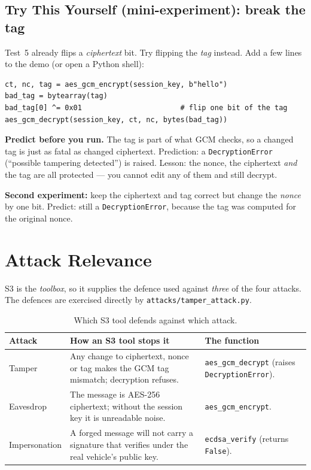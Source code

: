 \documentclass[11pt,a4paper]{report}
\begin{document}
\subsection{Try This Yourself (mini-experiment): break the tag}
Test~5 already flips a \emph{ciphertext} bit. Try flipping the \emph{tag}
instead. Add a few lines to the demo (or open a Python shell):
\begin{lstlisting}[style=term]
ct, nc, tag = aes_gcm_encrypt(session_key, b"hello")
bad_tag = bytearray(tag)
bad_tag[0] ^= 0x01                       # flip one bit of the tag
aes_gcm_decrypt(session_key, ct, nc, bytes(bad_tag))
\end{lstlisting}
\textbf{Predict before you run.} The tag is part of what GCM checks, so a changed
tag is just as fatal as changed ciphertext. Prediction: a
\texttt{DecryptionError} (``possible tampering detected'') is raised. Lesson: the
nonce, the ciphertext \emph{and} the tag are all protected --- you cannot edit
any of them and still decrypt.

\textbf{Second experiment:} keep the ciphertext and tag correct but change the
\emph{nonce} by one bit. Predict: still a \texttt{DecryptionError}, because the
tag was computed for the original nonce.

\section{Attack Relevance}

S3 is the \emph{toolbox}, so it supplies the defence used against \emph{three}
of the four attacks. The defences are exercised directly by
\texttt{attacks/tamper\_attack.py}.

\begin{table}[h]
\centering
\small
\begin{tabular}{@{}p{2.6cm} p{6.0cm} p{4.9cm}@{}}
\toprule
\textbf{Attack} & \textbf{How an S3 tool stops it} & \textbf{The function}\\
\midrule
Tamper & Any change to ciphertext, nonce or tag makes the GCM tag mismatch;
decryption refuses. & \texttt{aes\_gcm\_decrypt} (raises \texttt{DecryptionError}).\\
Eavesdrop & The message is AES-256 ciphertext; without the session key it is
unreadable noise. & \texttt{aes\_gcm\_encrypt}.\\
Impersonation & A forged message will not carry a signature that verifies under
the real vehicle's public key. & \texttt{ecdsa\_verify} (returns \texttt{False}).\\
\bottomrule
\end{tabular}
\caption{Which S3 tool defends against which attack.}
\end{table}
\end{document}
